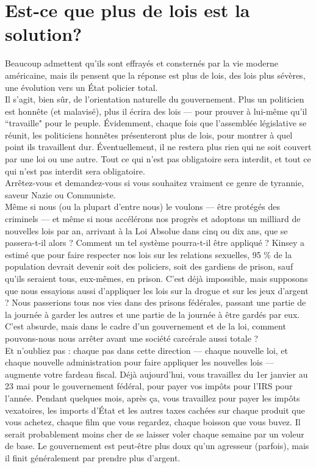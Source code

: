 \section*{Est-ce que plus de lois est la solution?}

Beaucoup admettent qu'ils sont effrayés et consternés par la vie moderne américaine, mais ils pensent que la réponse est plus de lois, des lois plus sévères, une évolution vers un État policier total.\\
Il s'agit, bien sûr, de l'orientation naturelle du gouvernement. Plus un politicien est honnête (et malavisé), plus il écrira des lois --- pour prouver à lui-même qu'il ``travaille" pour le peuple. Évidemment, chaque fois que l'assemblée législative se réunit, les politiciens honnêtes présenteront plus de lois, pour montrer à quel point ils travaillent dur. Éventuellement, il ne restera plus rien qui ne soit couvert par une loi ou une autre. Tout ce qui n'est pas obligatoire sera interdit, et tout ce qui n'est pas interdit sera obligatoire.\\
Arrêtez-vous et demandez-vous si vous souhaitez vraiment ce genre de tyrannie, saveur Nazie ou Communiste.\\
Même si nous (ou la plupart d'entre nous) le voulons --- être protégés des criminels --- et même si nous accélérons nos progrès et adoptons un milliard de nouvelles lois par an, arrivant à la Loi Absolue dans cinq ou dix ans, que se passera-t-il alors ? Comment un tel système pourra-t-il être appliqué ? Kinsey a estimé que pour faire respecter nos lois sur les relations sexuelles, 95 \% de la population devrait devenir soit des policiers, soit des gardiens de prison, sauf qu'ils seraient tous, eux-mêmes, en prison. C'est déjà impossible, mais supposons que nous essayions aussi d'appliquer les lois sur la drogue et sur les jeux d'argent ? Nous passerions tous nos vies dans des prisons fédérales, passant une partie de la journée à garder les autres et une partie de la journée à être gardés par eux.\\
C'est absurde, mais dans le cadre d'un gouvernement et de la loi, comment pouvons-nous nous arrêter avant une société carcérale aussi totale ?\\
Et n'oubliez pas : chaque pas dans cette direction --- chaque nouvelle loi, et chaque nouvelle administration pour faire appliquer les nouvelles lois --- augmente votre fardeau fiscal. Déjà aujourd'hui, vous travaillez du 1er janvier au 23 mai pour le gouvernement fédéral, pour payer vos impôts pour l'IRS pour l'année. Pendant quelques mois, après ça, vous travaillez pour payer les impôts vexatoires, les imports d'État et les autres taxes cachées sur chaque produit que vous achetez, chaque film que vous regardez, chaque boisson que vous buvez. Il serait probablement moins cher de se laisser voler chaque semaine par un voleur de base. Le gouvernement est peut-être plus doux qu'un agresseur (parfois), mais il finit généralement par prendre plus d'argent.


